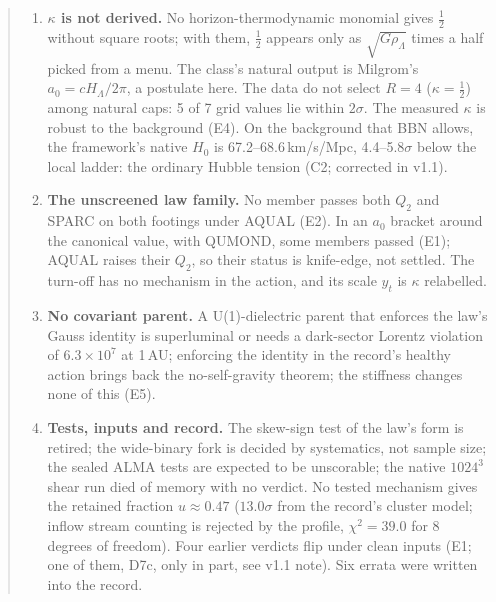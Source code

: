 \documentclass[10pt]{article}
\begin{document}
\begin{abstract}
\begin{enumerate}
\item \textbf{$\kappa$ is not derived.} No horizon-thermodynamic monomial gives $\tfrac12$ without square roots; with them, $\tfrac12$ appears only as $\sqrt{G\rho_\Lambda}$ times a half picked from a menu. The class's natural output is Milgrom's $a_0=cH_\Lambda/2\pi$, a postulate here. The data do not select $R=4$ ($\kappa=\tfrac12$) among natural caps: 5 of 7 grid values lie within $2\sigma$. The measured $\kappa$ is robust to the background (E4). On the background that BBN allows, the framework's native $H_0$ is 67.2--68.6\,km/s/Mpc, 4.4--5.8$\sigma$ below the local ladder: the ordinary Hubble tension (C2; corrected in v1.1).
\item \textbf{The unscreened law family.} No member passes both $Q_2$ and SPARC on both footings under AQUAL (E2). In an $a_0$ bracket around the canonical value, with QUMOND, some members passed (E1); AQUAL raises their $Q_2$, so their status is knife-edge, not settled. The turn-off has no mechanism in the action, and its scale $y_t$ is $\kappa$ relabelled.
\item \textbf{No covariant parent.} A U(1)-dielectric parent that enforces the law's Gauss identity is superluminal or needs a dark-sector Lorentz violation of $6.3\times10^{7}$ at 1\,AU; enforcing the identity in the record's healthy action brings back the no-self-gravity theorem; the stiffness changes none of this (E5).
\item \textbf{Tests, inputs and record.} The skew-sign test of the law's form is retired; the wide-binary fork is decided by systematics, not sample size; the sealed ALMA tests are expected to be unscorable; the native $1024^3$ shear run died of memory with no verdict. No tested mechanism gives the retained fraction $u\approx0.47$ ($13.0\sigma$ from the record's cluster model; inflow stream counting is rejected by the profile, $\chi^2=39.0$ for 8 degrees of freedom). Four earlier verdicts flip under clean inputs (E1; one of them, D7c, only in part, see v1.1 note). Six errata were written into the record.
\end{enumerate}
\end{abstract}
\end{document}
